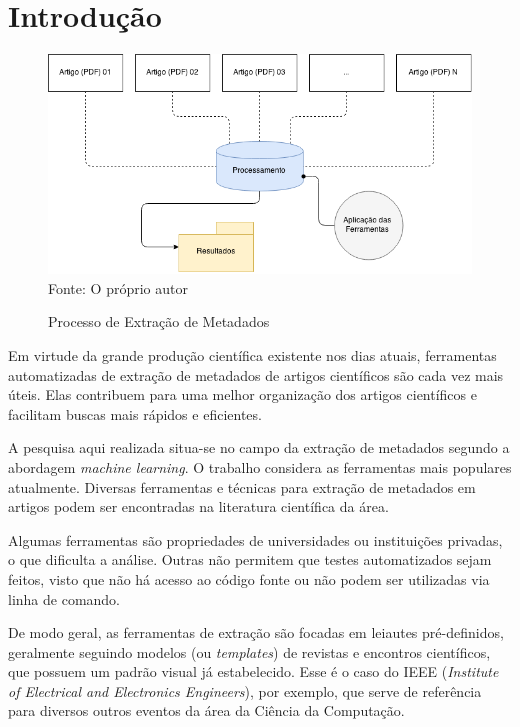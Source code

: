 
\chapter{Introdução}
\label{cha:introduction}


\begin{figure}
    \centering
    \caption{Processo de Extração de Metadados}
    \label{fig:introduction}
    \includegraphics[width=0.9\linewidth]{./assets/images/introduction}
    \center\footnotesize{Fonte: O próprio autor}
\end{figure}



Em virtude da grande produção científica existente nos dias atuais, ferramentas automatizadas de extração de metadados de artigos científicos são cada vez mais úteis. Elas contribuem para uma melhor organização dos artigos científicos e facilitam buscas mais rápidos e eficientes.

A pesquisa aqui realizada situa-se no campo da extração de metadados segundo a abordagem \textit{machine learning}. O trabalho considera as ferramentas mais populares atualmente. Diversas ferramentas e técnicas para extração de metadados em artigos podem ser encontradas na literatura científica da área. 

Algumas ferramentas são propriedades de universidades ou instituições privadas, o que dificulta a análise. Outras não permitem que testes automatizados sejam feitos, visto que não há acesso ao código fonte ou não podem ser utilizadas via linha de comando.

De modo geral, as ferramentas de extração são focadas em leiautes pré-definidos, geralmente seguindo modelos (ou \textit{templates}) de revistas e encontros científicos, que possuem um padrão visual já estabelecido. Esse é o caso do IEEE (\textit{Institute of Electrical and Electronics Engineers}), por exemplo, que serve de referência para diversos outros eventos da área da Ciência da Computação.

